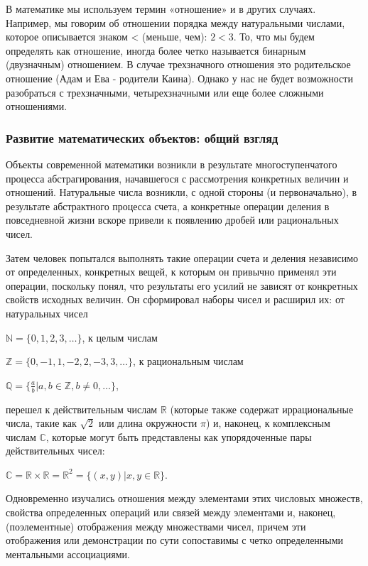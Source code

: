 В математике мы используем термин «отношение» и в других случаях. Например, мы говорим об отношении порядка между натуральными числами, которое описывается знаком < (меньше, чем): \(2 < 3\).
То, что мы будем определять как отношение, иногда более четко называется бинарным (двузначным) отношением. В случае трехзначного отношения это родительское отношение (Адам и Ева - родители Каина).
Однако у нас не будет возможности разобраться с трехзначными, четырехзначными или еще более сложными отношениями.

\subsubsection{Развитие математических объектов: общий взгляд}
Объекты современной математики возникли в результате многоступенчатого процесса абстрагирования, начавшегося с рассмотрения конкретных величин и отношений. Натуральные числа возникли, с одной стороны (и первоначально), в результате абстрактного процесса счета, а конкретные операции деления в повседневной жизни вскоре привели к появлению дробей или рациональных чисел.

Затем человек попытался выполнять такие операции счета и деления независимо от определенных, конкретных вещей, к которым он привычно применял эти операции, поскольку понял, что результаты его усилий не зависят от конкретных свойств исходных величин.
Он сформировал наборы чисел и расширил их: от натуральных чисел

\vspace{0.5cm}
\(\mathbb{N}=\{0,1,2,3,\dots\}\), к целым числам

\(\mathbb{Z}=\{0,-1,1,-2,2,-3,3,\dots\}\), к рациональным числам

\(\mathbb{Q}=\{\frac{a}{b}|a,b \in \mathbb{Z}, b \neq 0 ,\dots\}\),

\vspace{0.5cm}

перешел к действительным числам \(\mathbb{R}\) (которые также содержат иррациональные числа, такие как \(\sqrt {2}\) или длина окружности \(\pi\)) и, наконец, к комплексным числам \(\mathbb{C}\), которые могут быть представлены как упорядоченные пары действительных чисел:

\vspace{0.5cm}
\(\mathbb{C}=\mathbb{R} \times \mathbb{R} = \mathbb{R}^{2} = \{(x,y) | x,y \in \mathbb{R}\}\).

\vspace{0.5cm}

Одновременно изучались отношения между элементами этих числовых множеств, свойства определенных операций или связей между элементами и, наконец, (поэлементные) отображения между множествами чисел, причем эти отображения или демонстрации по сути сопоставимы с четко определенными ментальными ассоциациями.

